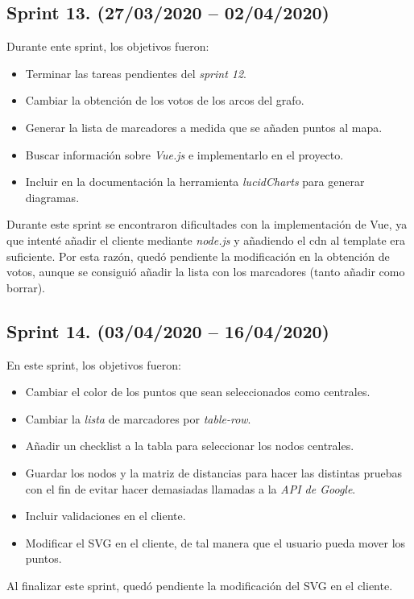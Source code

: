 \subsection{Sprint 13. (27/03/2020 -- 02/04/2020)}
Durante ente sprint, los objetivos fueron:
\begin{itemize}
	\item Terminar las tareas pendientes del \textit{sprint 12}.
	\item Cambiar la obtención de los votos de los arcos del grafo.
	\item Generar la lista de marcadores a medida que se añaden puntos al mapa.
	\item Buscar información sobre \textit{Vue.js} e implementarlo en el proyecto.
	\item Incluir en la documentación la herramienta \textit{lucidCharts} para generar diagramas.
\end{itemize}
Durante este sprint se encontraron dificultades con la implementación de Vue, ya que intenté añadir el cliente mediante \textit{node.js} y añadiendo el cdn al template era suficiente. Por esta razón, quedó pendiente la modificación en la obtención de votos, aunque se consiguió añadir la lista con los marcadores (tanto añadir como borrar).

\subsection{Sprint 14. (03/04/2020 -- 16/04/2020)}
En este sprint, los objetivos fueron:
\begin{itemize}
	\item Cambiar el color de los puntos que sean seleccionados como centrales.
	\item Cambiar la \textit{lista} de marcadores por \textit{table-row}.
	\item Añadir un checklist a la tabla para seleccionar los nodos centrales.
	\item Guardar los nodos y la matriz de distancias para hacer las distintas pruebas con el fin de evitar hacer demasiadas llamadas a la \textit{API de Google}.
	\item Incluir validaciones en el cliente.
	\item Modificar el SVG en el cliente, de tal manera que el usuario pueda mover los puntos.
\end{itemize}
Al finalizar este sprint, quedó pendiente la modificación del SVG en el cliente.

